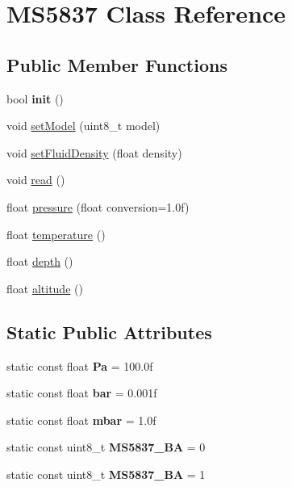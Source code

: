 \hypertarget{classMS5837}{}\section{M\+S5837 Class Reference}
\label{classMS5837}
\subsection*{Public Member Functions}
\begin{DoxyCompactItemize}
\item 
\mbox{\label{classMS5837_accd5fa071ae977c796e4fb0648954499}} 
bool {\bfseries init} ()
\item 
void \hyperlink{classMS5837_af8b0b1e168f39a9b99fa5918a6ef8f04}{set\+Model} (uint8\+\_\+t model)
\item 
void \hyperlink{classMS5837_a40ad0394fa84d49afa62ae63c411aa8f}{set\+Fluid\+Density} (float density)
\item 
void \hyperlink{classMS5837_a69b945b55b93c96173e8369fec1d9100}{read} ()
\item 
float \hyperlink{classMS5837_a14b4dd5598dc65e2d3f7c185e940af88}{pressure} (float conversion=1.\+0f)
\item 
float \hyperlink{classMS5837_a554d181ffc4329c1e292ca87e0a810f0}{temperature} ()
\item 
float \hyperlink{classMS5837_af5ec680e29a8cdaed429b9fb91d813e6}{depth} ()
\item 
float \hyperlink{classMS5837_af3c24ba068ed52a2918c784b3d608c8a}{altitude} ()
\end{DoxyCompactItemize}
\subsection*{Static Public Attributes}
\begin{DoxyCompactItemize}
\item 
\mbox{\label{classMS5837_ae54d04a637682f68502e79d221bf00e3}} 
static const float {\bfseries Pa} = 100.\+0f
\item 
\mbox{\label{classMS5837_afaf021ab4e8b402a642c383f35ff4258}} 
static const float {\bfseries bar} = 0.\+001f
\item 
\mbox{\label{classMS5837_a300724fab62674ab5e32a8b1861d3bba}} 
static const float {\bfseries mbar} = 1.\+0f
\item 
\mbox{\label{classMS5837_abc4a4367230b5ee53fbaf8060231a4bb}} 
static const uint8\+\_\+t {\bfseries M\+S5837\+\_\+BA} = 0
\item 
\mbox{\label{classMS5837_a5b94f94735c695d94882f689fc55e853}} 
static const uint8\+\_\+t {\bfseries M\+S5837\+\_\+BA} = 1
\end{DoxyCompactItemize}


